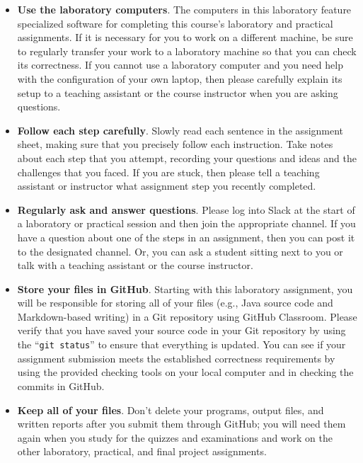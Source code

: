 \documentclass[11pt]{article}
\newcommand{\command}[1]{``\lstinline{#1}''}
\begin{document}
\begin{itemize}
  \setlength{\itemsep}{0pt}

\item {\bf Use the laboratory computers}. The computers in this laboratory feature specialized software for completing
  this course's laboratory and practical assignments. If it is necessary for you to work on a different machine, be sure
  to regularly transfer your work to a laboratory machine so that you can check its correctness. If you cannot use a
  laboratory computer and you need help with the configuration of your own laptop, then please carefully explain its
  setup to a teaching assistant or the course instructor when you are asking questions.

\item {\bf Follow each step carefully}. Slowly read each sentence in the assignment sheet, making sure that you
  precisely follow each instruction. Take notes about each step that you attempt, recording your questions and ideas and
  the challenges that you faced. If you are stuck, then please tell a teaching assistant or instructor what assignment
  step you recently completed.

\item {\bf Regularly ask and answer questions}. Please log into Slack at the start of a laboratory or practical session
  and then join the appropriate channel. If you have a question about one of the steps in an assignment, then you can
  post it to the designated channel. Or, you can ask a student sitting next to you or talk with a teaching assistant or
  the course instructor.

\item {\bf Store your files in GitHub}. Starting with this laboratory assignment, you will be responsible for storing
  all of your files (e.g., Java source code and Markdown-based writing) in a Git repository using GitHub Classroom.
  Please verify that you have saved your source code in your Git repository by using the \command{git status} to ensure
  that everything is updated. You can see if your assignment submission meets the established correctness requirements
  by using the provided checking tools on your local computer and in checking the commits in GitHub.

\item {\bf Keep all of your files}. Don't delete your programs, output files, and written reports after you submit them
  through GitHub; you will need them again when you study for the quizzes and examinations and work on the other
  laboratory, practical, and final project assignments.


\end{itemize}
\end{document}
